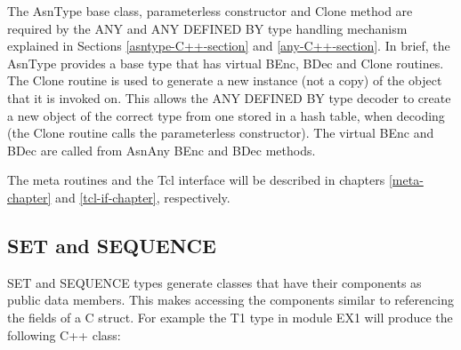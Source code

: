 The {\C AsnType} base class, parameterless constructor and
{\C Clone} method are required by the ANY and ANY DEFINED BY type
handling mechanism explained in Sections \ref{asntype-C++-section} and
\ref{any-C++-section}.  In brief, the {\C AsnType} provides a base type
that has virtual {\C BEnc}, {\C BDec} and {\C Clone} routines.
The {\C Clone} routine is used to generate a new instance (not a
copy) of the object that it is invoked on.  This allows the ANY
DEFINED BY type decoder to create a new object of the correct type
from one stored in a hash table, when decoding (the {\C Clone}
routine calls the parameterless constructor).  The virtual {\C BEnc}
and {\C BDec} are called from {\C AsnAny} {\C BEnc} and
{\C BDec} methods.

The meta routines and the Tcl interface will be described in chapters \ref{meta-chapter} and \ref{tcl-if-chapter}, respectively.

\subsection{\label{C++-set-seq-section}SET and SEQUENCE}

SET and SEQUENCE types generate classes that have their components as
public data members.  This makes accessing the components similar to
referencing the fields of a C struct.  For example the {\C T1} type in
module EX1 will produce the following C++ class:


